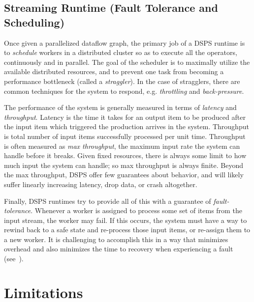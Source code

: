 \subsection{Streaming Runtime (Fault Tolerance and Scheduling)}

Once given a parallelized dataflow graph, the primary job of a DSPS runtime is to \emph{schedule} workers in a distributed cluster so as to execute all the operators, continuously and in parallel. The goal of the scheduler is to maximally utilize the available distributed resources, and to prevent one task from becoming a performance bottleneck (called a \emph{straggler}).
In the case of stragglers, there are common techniques for the system to respond, e.g. \emph{throttling} and \emph{back-pressure}.

The performance of the system is generally measured in terms of \emph{latency} and \emph{throughput}. Latency is the time it takes for an output item to be produced after the input item which triggered the production arrives in the system. Throughput is total number of input items successfully processed per unit time.
Throughput is often measured as \emph{max throughput}, the maximum input rate the system can handle before it breaks.
Given fixed resources, there is always some limit to how much input the system can handle; so max throughput is always finite. Beyond the max throughput, DSPS offer few guarantees about behavior, and will likely suffer linearly increasing latency, drop data, or crash altogether.

Finally, DSPS runtimes try to provide all of this with a guarantee of \emph{fault-tolerance}. Whenever a worker is assigned to process some set of items from the input stream, the worker may fail. If this occurs, the system must have a way to rewind back to a safe state and re-process those input items, or re-assign them to a new worker. It is challenging to accomplish this in a way that minimizes overhead and also minimizes the time to recovery when experiencing a fault (see~\cite{venkataraman2017drizzle}).

\section{Limitations}


